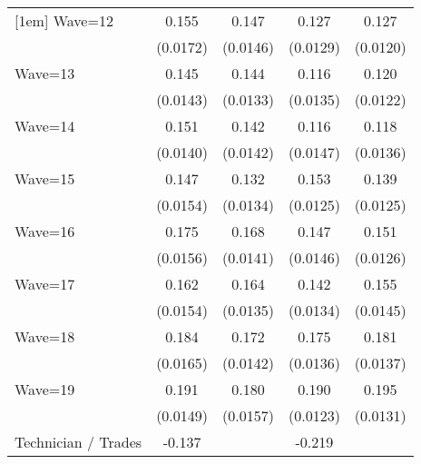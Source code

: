{\begin{tabular}{l*{4}{c}}
[1em]
Wave=12             &       0.155\sym{***}&       0.147\sym{***}&       0.127\sym{***}&       0.127\sym{***}\\
                    &    (0.0172)         &    (0.0146)         &    (0.0129)         &    (0.0120)         \\
[1em]
Wave=13             &       0.145\sym{***}&       0.144\sym{***}&       0.116\sym{***}&       0.120\sym{***}\\
                    &    (0.0143)         &    (0.0133)         &    (0.0135)         &    (0.0122)         \\
[1em]
Wave=14             &       0.151\sym{***}&       0.142\sym{***}&       0.116\sym{***}&       0.118\sym{***}\\
                    &    (0.0140)         &    (0.0142)         &    (0.0147)         &    (0.0136)         \\
[1em]
Wave=15             &       0.147\sym{***}&       0.132\sym{***}&       0.153\sym{***}&       0.139\sym{***}\\
                    &    (0.0154)         &    (0.0134)         &    (0.0125)         &    (0.0125)         \\
[1em]
Wave=16             &       0.175\sym{***}&       0.168\sym{***}&       0.147\sym{***}&       0.151\sym{***}\\
                    &    (0.0156)         &    (0.0141)         &    (0.0146)         &    (0.0126)         \\
[1em]
Wave=17             &       0.162\sym{***}&       0.164\sym{***}&       0.142\sym{***}&       0.155\sym{***}\\
                    &    (0.0154)         &    (0.0135)         &    (0.0134)         &    (0.0145)         \\
[1em]
Wave=18             &       0.184\sym{***}&       0.172\sym{***}&       0.175\sym{***}&       0.181\sym{***}\\
                    &    (0.0165)         &    (0.0142)         &    (0.0136)         &    (0.0137)         \\
[1em]
Wave=19             &       0.191\sym{***}&       0.180\sym{***}&       0.190\sym{***}&       0.195\sym{***}\\
                    &    (0.0149)         &    (0.0157)         &    (0.0123)         &    (0.0131)         \\
[1em]
Technician / Trades &      -0.137\sym{***}&                     &      -0.219\sym{***}&                     \\

\end{tabular}}
